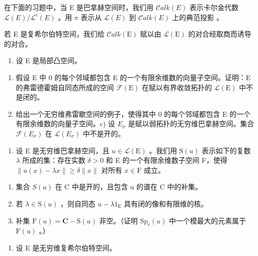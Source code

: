 \exercisesection{}

在下面的习题中，当 E 是巴拿赫空间时，我们用 \(\mathcal{C}alk(E)\) 表示卡尔金代数 \(\mathcal{L}(E)/\mathcal{L}^{c}(E)\) 。用 \(\pi\) 表示从 \(\mathcal{L}(E)\) 到 \(\mathcal{C}alk(E)\) 上的典范投影 。

若 E 是复希尔伯特空间，我们给 \(\mathcal{C}alk(\mathrm{E})\) 赋以由 \(\mathcal{L}(\mathrm{E})\) 的对合经取商而诱导的对合。

\begin{enumerate}
\def\labelenumi{\arabic{enumi})}
\tightlist
\item
  设 E 是局部凸空间。
\end{enumerate}

\begin{enumerate}
\def\labelenumi{\alph{enumi})}
\item
  假设 E 中 0 的每个邻域都包含 E 的一个有限余维数的向量子空间。证明：E 的弗雷德霍姆自同态所成的空间 \(\mathcal{F}(\mathrm{E})\) 在赋以有界收敛拓扑的 \(\mathcal{L}(\mathrm{E})\) 中不是闭的。
\item
  给出一个无穷维弗雷歇空间的例子，使得其中 0 的每个邻域都包含 E 的一个有限余维数的向量子空间。c) 设 \(E_{\sigma}\) 是赋以弱拓扑的无穷维巴拿赫空间。集合 \(\mathcal{F}(E_{\sigma})\) 在 \(\mathcal{L}(E_{\sigma})\) 中不是开的。
\end{enumerate}

\begin{enumerate}
\def\labelenumi{\arabic{enumi})}
\setcounter{enumi}{1}
\tightlist
\item
  设 E 是无穷维巴拿赫空间，且 \(u \in \mathcal{L}(\mathrm{E})\) 。我们用 \(\mathrm{S}(u)\) 表示如下的复数 \(\lambda\) 所成的集：存在实数 \(\delta > 0\) 和 E 的一个有限余维数子空间 F，使得 \(\| u(x) - \lambda x \| \geqslant \delta \| x \|\) 对所有 \(x \in \mathrm{F}\) 成立。
\end{enumerate}

\begin{enumerate}
\def\labelenumi{\alph{enumi})}
\item
  集合 \(S(u)\) 在 C 中是开的，且包含 u 的谱在 C 中的补集。
\item
  若 \(\lambda \in \mathrm{S}(u)\) ，则自同态 \(u - \lambda 1_{\mathrm{E}}\) 具有闭的像和有限维的核。
\item
  补集 \(\mathrm{F}(u) = \mathbf{C} - \mathrm{S}(u)\) 非空。（证明 \(\mathrm{Sp}_{\mathrm{e}}(u)\) 中一个模最大的元素属于 \(\mathrm{F}(u)\) 。）
\end{enumerate}

\begin{enumerate}
\def\labelenumi{\arabic{enumi})}
\setcounter{enumi}{2}
\tightlist
\item
  设 E 是无穷维复希尔伯特空间。
\end{enumerate}

